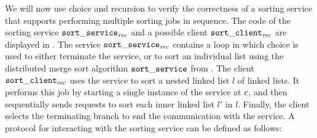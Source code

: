 \newcommand{\loopsortfig}{
\begin{figure}[t!]
\begin{equation*}
\begin{array}{l l}
\begin{array}[t]{@{}l@{}}
\listsortloopservicename\ \cmpvar\ \chan \eqdef \\
\quad\begin{array}[t]{@{}l@{}}
  \mbranchA \chan
  {\begin{array}[t]{@{} l}
     \listsortservicename\ \cmpvar\ \chan;\ \\
     \listsortloopservicename\ \cmpvar\ \chan
   \end{array}}
  \TT \\
\end{array}
\end{array}
&
\begin{array}[t]{@{}l@{}}
  \listsortloopclientname\ \cmpvar\ l \eqdef \\
  \quad \Let \chan = \start {\listsortloopservicename\ \cmpvar} in \\
  \quad \defemph{iter}\ (\Lam l'. \select \chan \leftname;\ \send \chan {l'};\ \recv \chan)\ l; \\
  \quad \select \chan \rightname
\end{array}
\end{array}
\end{equation*}
\caption{A recursive version of the sort service that can perform multiple jobs in sequence
(the code for the function $\defemph{iter}$, which applies a function to each
element of the list, is standard and has been elided).}
\label{fig:loopservice}
\end{figure}
}

We will now use choice and recursion to verify the correctness
of a sorting service that supports performing multiple sorting jobs in sequence.
The code of the sorting service $\mathtt{sort\_service}_{\mathit{rec}}$ and a possible
client $\mathtt{sort\_client}_{\mathit{rec}}$ are displayed in .
The service $\mathtt{sort\_service}_{\mathit{rec}}$ contains a loop in which choice is
used to either terminate the service, or to sort an individual list using the
distributed merge sort algorithm $\mathtt{sort\_service}$ from .
The client $\mathtt{sort\_client}_{\mathit{rec}}$ uses the service to sort a nested linked
list $l$ of linked lists.
It performs this job by starting a single instance of the service at $c$, and then
sequentially sends requests to sort each inner linked list $l'$ in $l$.
Finally, the client selects the terminating branch to end the communication with
the service.
A protocol for interacting with the sorting service can be defined as follows:

